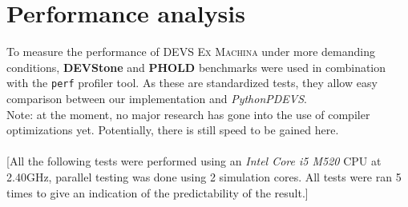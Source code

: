 \documentclass[8pt,a4paper]{report}
\begin{document}
\chapter{Performance analysis}
To measure the performance of \textsc{DEVS Ex Machina} under more demanding conditions, \textbf{DEVStone} and \textbf{PHOLD} benchmarks were used in combination with the \texttt{perf} profiler tool. As these are standardized tests, they allow easy comparison between our implementation and \textit{PythonPDEVS}.\\
Note: at the moment, no major research has gone into the use of compiler optimizations yet. Potentially, there is still speed to be gained here.\\
\\
{\footnotesize[All the following tests were performed using an \textit{Intel Core i5 M520} CPU at 2.40GHz, parallel testing was done using 2 simulation cores. All tests were ran 5 times to give an indication of the predictability of the result.]}

\pagebreak
\end{document}
